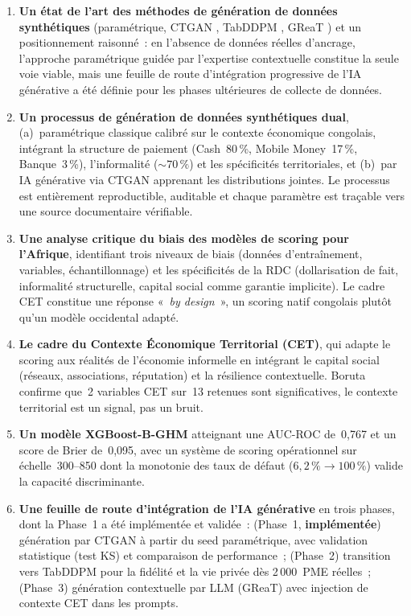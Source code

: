 \documentclass[12pt, a4paper, twocolumn]{article}
\begin{document}
\begin{enumerate}[leftmargin=*]
  \item \textbf{Un état de l'art des méthodes de génération de données synthétiques} (paramétrique, CTGAN \cite{xu2019ctgan}, TabDDPM \cite{kotelnikov2023}, GReaT \cite{borisov2023}) et un positionnement raisonné~: en l'absence de données réelles d'ancrage, l'approche paramétrique guidée par l'expertise contextuelle constitue la seule voie viable, mais une feuille de route d'intégration progressive de l'IA générative a été définie pour les phases ultérieures de collecte de données.

  \item \textbf{Un processus de génération de données synthétiques dual}, (a)~paramétrique classique calibré sur le contexte économique congolais, intégrant la structure de paiement (Cash~80\,\%, Mobile Money~17\,\%, Banque~3\,\%), l'informalité (${\sim}70\,\%$) et les spécificités territoriales, et (b)~par IA générative via CTGAN apprenant les distributions jointes. Le processus est entièrement reproductible, auditable et chaque paramètre est traçable vers une source documentaire vérifiable.

  \item \textbf{Une analyse critique du biais des modèles de scoring pour l'Afrique}, identifiant trois niveaux de biais (données d'entraînement, variables, échantillonnage) et les spécificités de la RDC (dollarisation de fait, informalité structurelle, capital social comme garantie implicite). Le cadre CET constitue une réponse «~\textit{by design}~», un scoring natif congolais plutôt qu'un modèle occidental adapté.

  \item \textbf{Le cadre du Contexte Économique Territorial (CET)}, qui adapte le scoring aux réalités de l'économie informelle en intégrant le capital social (réseaux, associations, réputation) et la résilience contextuelle. Boruta confirme que~2 variables CET sur~13 retenues sont significatives, le contexte territorial est un signal, pas un bruit.

  \item \textbf{Un modèle XGBoost-B-GHM} atteignant une AUC-ROC de~0,767 et un score de Brier de~0,095, avec un système de scoring opérationnel sur échelle~300--850 dont la monotonie des taux de défaut ($6{,}2\,\% \to 100\,\%$) valide la capacité discriminante.

  \item \textbf{Une feuille de route d'intégration de l'IA générative} en trois phases, dont la Phase~1 a été implémentée et validée~: (Phase~1, \textbf{implémentée}) génération par CTGAN à partir du seed paramétrique, avec validation statistique (test KS) et comparaison de performance~; (Phase~2) transition vers TabDDPM pour la fidélité et la vie privée dès 2\,000~PME réelles~; (Phase~3) génération contextuelle par LLM (GReaT) avec injection de contexte CET dans les prompts.


\end{enumerate}
\end{document}
